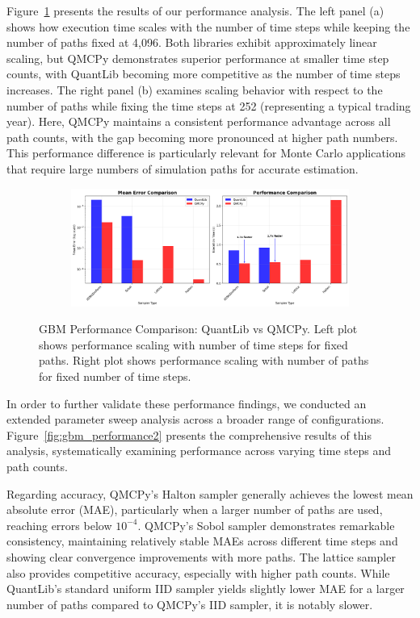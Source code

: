 Figure~\ref{fig:gbm_performance} presents the results of our performance
analysis. The left panel (a) shows how execution time scales with the number of
time steps while keeping the number of paths fixed at 4,096. Both libraries
exhibit approximately linear scaling, but QMCPy demonstrates superior
performance at smaller time step counts, with QuantLib becoming more competitive
as the number of time steps increases. The right panel (b) examines scaling
behavior with respect to the number of paths while fixing the time steps at 252
(representing a typical trading year). Here, QMCPy maintains a consistent
performance advantage across all path counts, with the gap becoming more
pronounced at higher path numbers. This performance difference is particularly
relevant for Monte Carlo applications that require large numbers of simulation
paths for accurate estimation.

\begin{figure}[H]
    \centering
    \begin{subfigure}{1\textwidth}
        \centering
        \includegraphics[width=\textwidth]{GBM/images/figure_6.png}
    \end{subfigure}
    \caption{GBM Performance Comparison: QuantLib vs QMCPy. Left plot shows performance scaling with number of time steps for fixed paths. Right plot shows performance scaling with number of paths for fixed number of time steps.}
    \label{fig:gbm_performance}
\end{figure}

In order to further validate these performance findings, we conducted an extended
parameter sweep analysis across a broader range of configurations.
Figure~\ref{fig:gbm_performance2} presents the comprehensive results of this
analysis, systematically examining performance across varying time steps and
path counts. 

Regarding accuracy, QMCPy's Halton sampler generally achieves the lowest mean
absolute error (MAE), particularly when a larger number of paths are used,
reaching errors below $10^{-4}$. QMCPy's Sobol sampler demonstrates remarkable
consistency, maintaining relatively stable MAEs across different time steps and
showing clear convergence improvements with more paths. The lattice sampler also
provides competitive accuracy, especially with higher path counts. While
QuantLib's standard uniform IID sampler yields slightly lower MAE for a larger
number of paths compared to QMCPy's IID sampler, it is notably slower.

